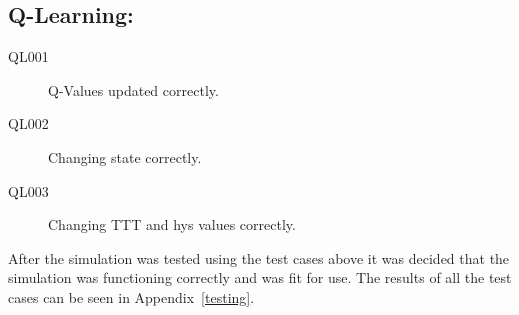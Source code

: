 \subsection*{Q-Learning:}
\begin{description}
\item[QL001]	Q-Values updated correctly.
\item[QL002]	Changing state correctly.
\item[QL003]	Changing TTT and hys values correctly.
\end{description}
After the simulation was tested using the test cases above it was decided that the simulation was functioning correctly and was fit for use. The results of all the test cases can be seen in Appendix~\ref{testing}.
